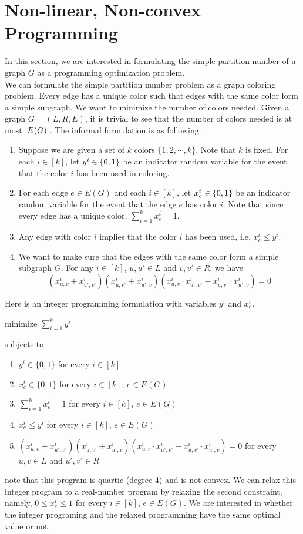 \section{Non-linear, Non-convex Programming}
In this section, we are interested in formulating the simple partition number of a graph $ G $ as a programming optimization problem. \\
We can formulate the simple partition number problem as a graph coloring problem. Every edge has a unique color such that edges with the same color form a simple subgraph. We want to minimize the number of colors needed. Given a graph $ G = (L, R, E)$, it is trivial to see that the number of colors needed is at most $ \left\vert{E(G)}\right\vert $. The informal formulation is as following. 
\begin{enumerate}
	\item Suppose we are given a set of $ k $ colors $ \{1, 2, \cdots , k \} $. Note that $ k $ is fixed. For each $  i \in [k] $, let $ y^i \in {\{0,1\}} $ be an indicator random variable for the event that the color $ i $ has been used in coloring. 
	\item For each edge $ e \in E(G) $ and each $ i \in [k] $, let $ x_e^i \in {\{0,1\}} $ be an indicator random variable for the event that the edge $ e $ has color $ i $. Note that since every edge has a unique color, $ \sum\limits_{i = 1}^k x_e^i = 1 $. 
	\item Any edge with color $ i $ implies that the color $ i $ has been used, i.e, $ x_e^i \leq y^i $. 
	\item We want to make sure that the edges with the same color  form a simple subgraph $ G $. For any $ i \in [k]$, $ u, u' \in L $ and $ v, v' \in R  $, we have 
	$$(x_{u,v}^i + x_{u',v'}^i) (x_{u,v'}^i + x_{u',v}^i)( x_{u,v}^i \cdot x_{u', v'}^i - x_{u, v'}^i \cdot x_{u', v}^i) = 0 $$
\end{enumerate}
Here is an integer programming formulation with variables $ y^i $ and $ x_e^i $. 

minimize $ \sum\limits_{i =1}^k y^i $ 

subjects to 
\begin{enumerate}
	\item $ y^i \in \{0,1 \} $ for every $ i \in [k] $
	\item $ x_e^i \in \{ 0,1 \} $ for every $  i \in [k] $, $  e \in E(G) $
	\item $ \sum\limits_{i =1}^k x_e^i = 1 $ for every $  i \in [k] $, $  e \in E(G) $
	\item $ x_e^i \leq y^i $ for every $  i \in [k] $, $  e \in E(G) $
	\item $(x_{u,v}^i + x_{u',v'}^i) (x_{u,v'}^i + x_{u',v}^i)( x_{u,v}^i \cdot x_{u', v'}^i - x_{u, v'}^i \cdot x_{u', v}^i) = 0 $ for every $ u, v\in L $ and $ u', v' \in R $
\end{enumerate}
note that this program is quartic (degree 4) and is not convex. We can relax this integer program to a real-number program by relaxing the second constraint, namely, $ 0 \leq x_e^i  \leq 1 $ for every $  i \in [k] $, $  e \in E(G) $. We are interested in whether the integer programing and the relaxed programming have the same optimal value or not. 


